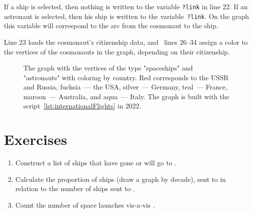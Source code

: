 If a ship is selected, then nothing is written to the variable \lstinline|?link| in line 22. If an astronaut is selected, then his ship is written to the variable~\lstinline|?link|. On the graph this variable will correspond to the arc from the cosmonaut to the ship. 

Line 23 loads the cosmonaut's citizenship data, and~ lines 26--34 assign a color to the vertices of the cosmonauts in the graph, depending on their citizenship. 

\begin{figure}[h]
  \setlength{\fboxsep}{0pt}%
  \setlength{\fboxrule}{1pt}%
  \caption[The graph with the vertices of the type "spaceships" and "astronauts" with coloring by country]{The graph with the vertices of the type "spaceships" and "astronauts" with coloring by country. Red corresponds to the USSR and Russia, fuchsia~--- the USA, silver~--- Germany, teal~--- France, maroon~--- Australia, and aqua~--- Italy. The graph is built with the script~\protect\ref{lst:internationalFlights} in 2022.}
  \label{fig:internationalFlights}%
\end{figure}

\section{Exercises}
\begin{enumerate}
  \item Construct a list of ships that have gone or will go to .
  \item Calculate the proportion of ships (draw a graph by decade), 
        sent to  
        in relation to the number of ships sent to .
  \item Count the number of  space launches 
      vis-a-vis .%
\end{enumerate}
